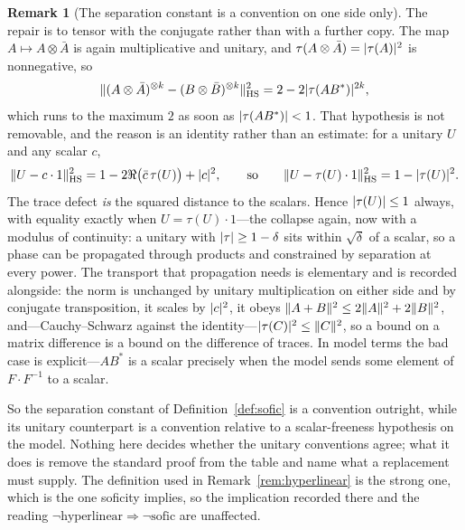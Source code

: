 \documentclass[11pt]{amsart}
\theoremstyle{definition}
\newtheorem{remark}[theorem]{Remark}
\theoremstyle{plain}
\DeclarePairedDelimiter{\abs}{\lvert}{\rvert}
\DeclarePairedDelimiter{\norm}{\lVert}{\rVert}
\begin{document}
\begin{remark}[The separation constant is a convention on one side only]
The repair is to tensor with the conjugate rather than with a further copy.  The map \(A\mapsto A\otimes\bar A\) is again multiplicative and unitary, and \(\tau(A\otimes\bar A)=\abs{\tau(A)}^2\) is nonnegative, so
\[
 \norm{(A\otimes\bar A)^{\otimes k}-(B\otimes\bar B)^{\otimes k}}^2_{\mathrm{HS}}
 =2-2\abs{\tau(AB^*)}^{2k},
\]
which runs to the maximum \(2\) as soon as \(\abs{\tau(AB^*)}<1\).  That hypothesis is not removable, and the reason is an identity rather than an estimate: for a unitary \(U\) and any scalar \(c\),
\[
 \norm{U-c\cdot1}^2_{\mathrm{HS}}=1-2\Re\bigl(\bar c\,\tau(U)\bigr)+\abs c^2 ,
 \qquad\text{so}\qquad
 \norm{U-\tau(U)\cdot1}^2_{\mathrm{HS}}=1-\abs{\tau(U)}^2 .
\]
The trace defect \emph{is} the squared distance to the scalars.  Hence \(\abs{\tau(U)}\leq1\) always, with equality exactly when \(U=\tau(U)\cdot1\)---the collapse again, now with a modulus of continuity: a unitary with \(\abs{\tau}\geq1-\delta\) sits within \(\sqrt\delta\) of a scalar, so a phase can be propagated through products and constrained by separation at every power.  The transport that propagation needs is elementary and is recorded alongside: the norm is unchanged by unitary multiplication on either side and by conjugate transposition, it scales by \(\abs c^2\), it obeys \(\norm{A+B}^2\leq2\norm A^2+2\norm B^2\), and---Cauchy--Schwarz against the identity---\(\abs{\tau(C)}^2\leq\norm C^2\), so a bound on a matrix difference is a bound on the difference of traces.  In model terms the bad case is explicit---\(A B^*\) is a scalar precisely when the model sends some element of \(F\!\cdot\!F^{-1}\) to a scalar.

So the separation constant of Definition~\ref{def:sofic} is a convention outright, while its unitary counterpart is a convention relative to a scalar-freeness hypothesis on the model.  Nothing here decides whether the unitary conventions agree; what it does is remove the standard proof from the table and name what a replacement must supply.  The definition used in Remark~\ref{rem:hyperlinear} is the strong one, which is the one soficity implies, so the implication recorded there and the reading \(\neg\text{hyperlinear}\Rightarrow\neg\text{sofic}\) are unaffected.
\end{remark}
\end{document}
